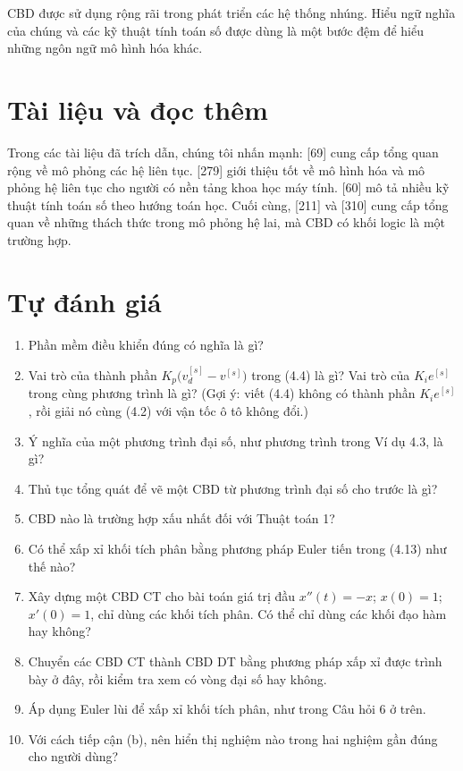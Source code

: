 CBD được sử dụng rộng rãi trong phát triển các hệ thống nhúng. Hiểu ngữ nghĩa của chúng và các kỹ thuật tính toán số được dùng là một bước đệm để hiểu những ngôn ngữ mô hình hóa khác.

\section{Tài liệu và đọc thêm}
Trong các tài liệu đã trích dẫn, chúng tôi nhấn mạnh: [69] cung cấp tổng quan rộng về mô phỏng các hệ liên tục. [279] giới thiệu tốt về mô hình hóa và mô phỏng hệ liên tục cho người có nền tảng khoa học máy tính. [60] mô tả nhiều kỹ thuật tính toán số theo hướng toán học. Cuối cùng, [211] và [310] cung cấp tổng quan về những thách thức trong mô phỏng hệ lai, mà CBD có khối logic là một trường hợp.

\section{Tự đánh giá}
\begin{enumerate}
\item Phần mềm điều khiển đúng có nghĩa là gì?
\item Vai trò của thành phần $K_p\bigl(v_d^{[s]}-v^{[s]}\bigr)$ trong (4.4) là gì? Vai trò của $K_i e^{[s]}$ trong cùng phương trình là gì? (Gợi ý: viết (4.4) không có thành phần $K_i e^{[s]}$, rồi giải nó cùng (4.2) với vận tốc ô tô không đổi.)
\item Ý nghĩa của một phương trình đại số, như phương trình trong Ví dụ 4.3, là gì?
\item Thủ tục tổng quát để vẽ một CBD từ phương trình đại số cho trước là gì?
\item CBD nào là trường hợp xấu nhất đối với Thuật toán 1?
\item Có thể xấp xỉ khối tích phân bằng phương pháp Euler tiến trong (4.13) như thế nào?
\item Xây dựng một CBD CT cho bài toán giá trị đầu $x''(t)=-x$; $x(0)=1$; $x'(0)=1$, chỉ dùng các khối tích phân. Có thể chỉ dùng các khối đạo hàm hay không?
\item Chuyển các CBD CT thành CBD DT bằng phương pháp xấp xỉ được trình bày ở đây, rồi kiểm tra xem có vòng đại số hay không.
\item Áp dụng Euler lùi để xấp xỉ khối tích phân, như trong Câu hỏi 6 ở trên.
\item Với cách tiếp cận (b), nên hiển thị nghiệm nào trong hai nghiệm gần đúng cho người dùng?
\end{enumerate}
